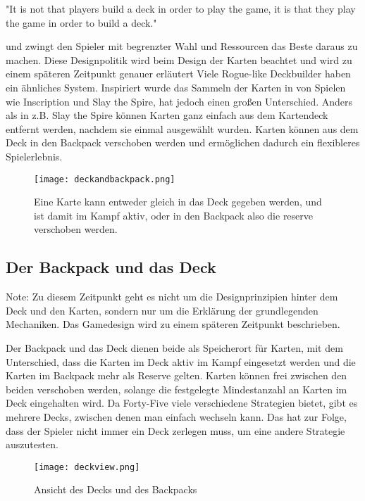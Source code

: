 "It is not that players build a deck in order to play the game, it is that they play the game in order to build a deck."

und zwingt den Spieler mit begrenzter Wahl und Ressourcen das Beste daraus zu machen. Diese Designpolitik wird beim Design der Karten beachtet und wird zu einem späteren Zeitpunkt genauer erläutert %
Viele Rogue-like Deckbuilder haben ein ähnliches System. Inspiriert wurde das Sammeln der Karten in \FF von Spielen wie Inscription und Slay the Spire,
hat jedoch einen großen Unterschied. Anders als in z.B. Slay the Spire können Karten ganz einfach aus dem Kartendeck entfernt werden, nachdem sie einmal ausgewählt wurden.
Karten können aus dem Deck in den Backpack verschoben werden und ermöglichen dadurch ein flexibleres Spielerlebnis.


\begin{figure}[H]
    \texttt{[image: deckandbackpack.png]}
    \caption{Eine Karte kann entweder gleich in das Deck gegeben werden, und ist damit im Kampf aktiv, oder in den Backpack also die reserve verschoben werden.}
\end{figure}

\subsection{Der Backpack und das Deck}\label{backpack_and_deck}
\begin{infoBox}
Note: Zu diesem Zeitpunkt geht es nicht um die Designprinzipien hinter dem Deck und den Karten,
sondern nur um die Erklärung der grundlegenden Mechaniken. Das Gamedesign wird zu einem späteren Zeitpunkt beschrieben.
\end{infoBox}
Der Backpack und das Deck dienen beide als Speicherort für Karten, mit dem Unterschied, dass die Karten im Deck aktiv im
Kampf eingesetzt werden und die Karten im Backpack mehr als Reserve gelten.
Karten können frei zwischen den beiden verschoben werden, solange die festgelegte Mindestanzahl an Karten im Deck eingehalten wird.
Da Forty-Five viele verschiedene Strategien bietet, gibt es mehrere Decks, zwischen denen man einfach wechseln kann.
Das hat zur Folge, dass der Spieler nicht immer ein Deck zerlegen muss, um eine andere Strategie auszutesten.

\begin{figure}[H]
    \texttt{[image: deckview.png]}
    \caption{Ansicht des Decks und des Backpacks}
\end{figure}


